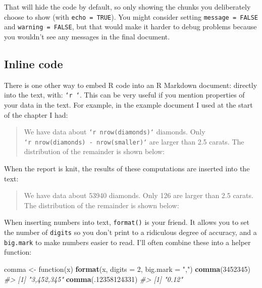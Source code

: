 \documentclass[]{book}
\newenvironment{Shaded}{\begin{snugshade}}{\end{snugshade}}
\newcommand{\KeywordTok}[1]{\textcolor[rgb]{0.13,0.29,0.53}{\textbf{{#1}}}}
\newcommand{\DataTypeTok}[1]{\textcolor[rgb]{0.13,0.29,0.53}{{#1}}}
\newcommand{\DecValTok}[1]{\textcolor[rgb]{0.00,0.00,0.81}{{#1}}}
\newcommand{\StringTok}[1]{\textcolor[rgb]{0.31,0.60,0.02}{{#1}}}
\newcommand{\CommentTok}[1]{\textcolor[rgb]{0.56,0.35,0.01}{\textit{{#1}}}}
\newcommand{\OtherTok}[1]{\textcolor[rgb]{0.56,0.35,0.01}{{#1}}}
\newcommand{\NormalTok}[1]{{#1}}
\begin{document}
\begin{Shaded}
\end{Shaded}

That will hide the code by default, so only showing the chunks you
deliberately choose to show (with \texttt{echo\ =\ TRUE}). You might
consider setting \texttt{message\ =\ FALSE} and
\texttt{warning\ =\ FALSE}, but that would make it harder to debug
problems because you wouldn't see any messages in the final document.

\subsection{Inline code}\label{inline-code}

There is one other way to embed R code into an R Markdown document:
directly into the text, with: \texttt{`r\ `}. This can be very useful if
you mention properties of your data in the text. For example, in the
example document I used at the start of the chapter I had:

\begin{quote}
We have data about \texttt{`r\ nrow(diamonds)`} diamonds. Only
\texttt{`r\ nrow(diamonds)\ -\ nrow(smaller)`} are larger than 2.5
carats. The distribution of the remainder is shown below:
\end{quote}

When the report is knit, the results of these computations are inserted
into the text:

\begin{quote}
We have data about 53940 diamonds. Only 126 are larger than 2.5 carats.
The distribution of the remainder is shown below:
\end{quote}

When inserting numbers into text, \texttt{format()} is your friend. It
allows you to set the number of \texttt{digits} so you don't print to a
ridiculous degree of accuracy, and a \texttt{big.mark} to make numbers
easier to read. I'll often combine these into a helper function:

\begin{Shaded}
\begin{Highlighting}[]
\NormalTok{comma <-}\StringTok{ }\NormalTok{function(x) }\KeywordTok{format}\NormalTok{(x, }\DataTypeTok{digits =} \DecValTok{2}\NormalTok{, }\DataTypeTok{big.mark =} \StringTok{","}\NormalTok{)}
\KeywordTok{comma}\NormalTok{(}\DecValTok{3452345}\NormalTok{)}
\CommentTok{#> [1] "3,452,345"}
\KeywordTok{comma}\NormalTok{(.}\DecValTok{12358124331}\NormalTok{)}
\CommentTok{#> [1] "0.12"}
\end{Highlighting}
\end{Shaded}
\end{document}
